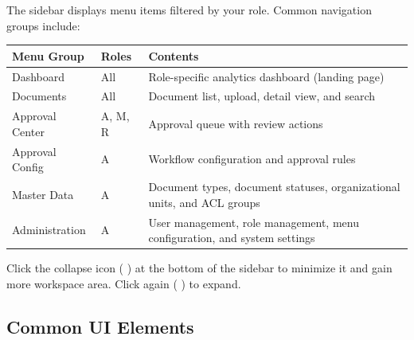 The sidebar displays menu items filtered by your role. Common
navigation groups include:

\begin{tabularx}{\textwidth}{@{} l l X @{}}
  \toprule
  \textbf{Menu Group} & \textbf{Roles}
    & \textbf{Contents} \\
  \midrule
  Dashboard
    & All
    & Role-specific analytics dashboard (landing page) \\
  Documents
    & All
    & Document list, upload, detail view, and search \\
  Approval Center
    & A, M, R
    & Approval queue with review actions \\
  Approval Config
    & A
    & Workflow configuration and approval rules \\
  Master Data
    & A
    & Document types, document statuses, organizational
      units, and ACL groups \\
  Administration
    & A
    & User management, role management, menu
      configuration, and system settings \\
  \bottomrule
\end{tabularx}

\begin{ugTip}
  Click the collapse icon (\,\faAngleDoubleLeft\,) at the bottom
  of the sidebar to minimize it and gain more workspace area.
  Click again (\,\faAngleDoubleRight\,) to expand.
\end{ugTip}

\subsection{Common UI Elements}

